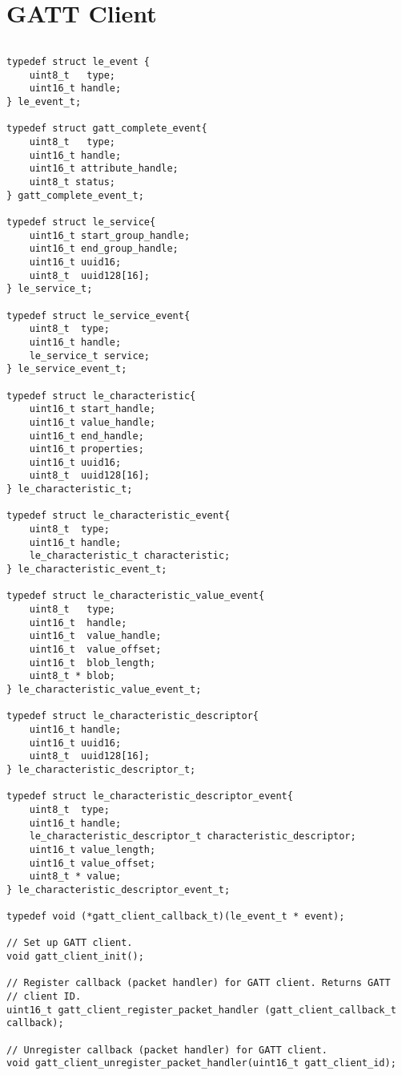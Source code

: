 \section{GATT Client}
\label{appendix:api_gatt_client}
$ $
\begin{lstlisting}
typedef struct le_event {
    uint8_t   type;
    uint16_t handle;
} le_event_t;

typedef struct gatt_complete_event{
    uint8_t   type;
    uint16_t handle;
    uint16_t attribute_handle;
    uint8_t status;
} gatt_complete_event_t;

typedef struct le_service{
    uint16_t start_group_handle;
    uint16_t end_group_handle;
    uint16_t uuid16;
    uint8_t  uuid128[16];
} le_service_t;

typedef struct le_service_event{
    uint8_t  type;
    uint16_t handle;
    le_service_t service;
} le_service_event_t;

typedef struct le_characteristic{
    uint16_t start_handle;
    uint16_t value_handle;
    uint16_t end_handle;
    uint16_t properties;
    uint16_t uuid16;
    uint8_t  uuid128[16];
} le_characteristic_t;

typedef struct le_characteristic_event{
    uint8_t  type;
    uint16_t handle;
    le_characteristic_t characteristic;
} le_characteristic_event_t;

typedef struct le_characteristic_value_event{
    uint8_t   type;
    uint16_t  handle;
    uint16_t  value_handle;
    uint16_t  value_offset;
    uint16_t  blob_length;
    uint8_t * blob;
} le_characteristic_value_event_t;

typedef struct le_characteristic_descriptor{
    uint16_t handle;
    uint16_t uuid16;
    uint8_t  uuid128[16];
} le_characteristic_descriptor_t;

typedef struct le_characteristic_descriptor_event{
    uint8_t  type;
    uint16_t handle;
    le_characteristic_descriptor_t characteristic_descriptor;
    uint16_t value_length;
    uint16_t value_offset;
    uint8_t * value;
} le_characteristic_descriptor_event_t;

typedef void (*gatt_client_callback_t)(le_event_t * event);

// Set up GATT client.
void gatt_client_init();

// Register callback (packet handler) for GATT client. Returns GATT 
// client ID.
uint16_t gatt_client_register_packet_handler (gatt_client_callback_t callback);

// Unregister callback (packet handler) for GATT client.
void gatt_client_unregister_packet_handler(uint16_t gatt_client_id);


\end{lstlisting}

